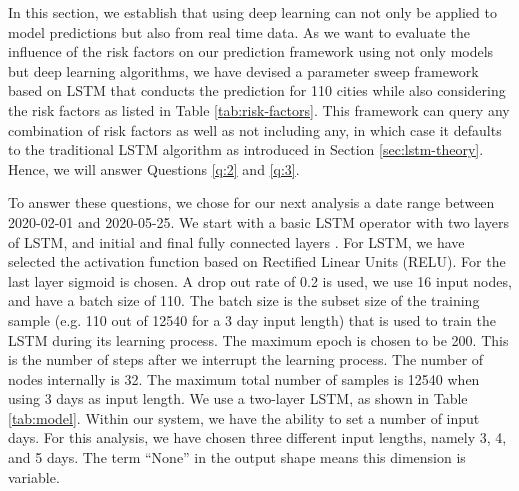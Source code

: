 \documentclass[a4paper, inpress]{jds} %
\renewcommand{\_}{%
    \textunderscore\hspace{0pt}%
}
\begin{document}
In this section, we establish that using deep learning can not only be
applied to model predictions but also from real time data. As we want to
evaluate the influence of the risk factors on our prediction framework
using not only models but deep learning algorithms, we have devised a
parameter sweep framework based on LSTM that conducts the prediction
for 110 cities while also considering the risk factors as listed
in Table \ref{tab:risk-factors}. This framework can query any
combination of risk factors as well as not including any, in which
case it defaults to the traditional LSTM algorithm as introduced in
Section \ref{sec:lstm-theory}. Hence, we will answer Questions
\ref{q:2} and \ref{q:3}.

To answer these questions, we chose for our next analysis a date range
between 2020-02-01 and 2020-05-25. We start with a basic LSTM operator
with two layers of LSTM, and initial and final fully connected layers
\citep{Kadupitiya2020-zq}.  For LSTM, we have selected the activation
function based on Rectified Linear Units (RELU). For the last layer
sigmoid is chosen. A drop out rate of 0.2 is used, we use 16 input
nodes, and have a batch size of 110. The  
batch size is the subset size of the training sample (e.g. 110 out of 12540 for a 3 day input length) that is used to train the LSTM during its learning process. The maximum epoch is chosen to be
200. This is the number of steps after we interrupt the learning process. The number of nodes internally is 32. The maximum total number of
samples is 12540 when using 3 days as input length. We use a two-layer
LSTM, as shown in Table \ref{tab:model}. Within our system, we have
the ability to set a number of input days. For this analysis, we have
chosen three different input lengths, namely 3, 4, and 5 days. The
term ``None'' in the output shape means this dimension is
variable. 
\end{document}
